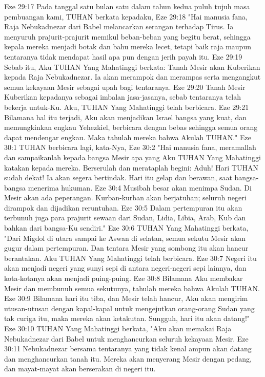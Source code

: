 Eze 29:17  Pada tanggal satu bulan satu dalam tahun kedua puluh tujuh masa pembuangan kami, TUHAN berkata kepadaku,
Eze 29:18  "Hai manusia fana, Raja Nebukadnezar dari Babel melancarkan serangan terhadap Tirus. Ia menyuruh prajurit-prajurit memikul beban-beban yang begitu berat, sehingga kepala mereka menjadi botak dan bahu mereka lecet, tetapi baik raja maupun tentaranya tidak mendapat hasil apa pun dengan jerih payah itu.
Eze 29:19  Sebab itu, Aku TUHAN Yang Mahatinggi berkata: Tanah Mesir akan Kuberikan kepada Raja Nebukadnezar. Ia akan merampok dan merampas serta mengangkut semua kekayaan Mesir sebagai upah bagi tentaranya.
Eze 29:20  Tanah Mesir Kuberikan kepadanya sebagai imbalan jasa-jasanya, sebab tentaranya telah bekerja untuk-Ku. Aku, TUHAN Yang Mahatinggi telah berbicara.
Eze 29:21  Bilamana hal itu terjadi, Aku akan menjadikan Israel bangsa yang kuat, dan memungkinkan engkau Yehezkiel, berbicara dengan bebas sehingga semua orang dapat mendengar engkau. Maka tahulah mereka bahwa Akulah TUHAN."
Eze 30:1  TUHAN berbicara lagi, kata-Nya,
Eze 30:2  "Hai manusia fana, meramallah dan sampaikanlah kepada bangsa Mesir apa yang Aku TUHAN Yang Mahatinggi katakan kepada mereka. Berserulah dan merataplah begini: Aduh! Hari TUHAN sudah dekat! Ia akan segera bertindak. Hari itu gelap dan berawan, saat bangsa-bangsa menerima hukuman.
Eze 30:4  Musibah besar akan menimpa Sudan. Di Mesir akan ada peperangan. Kurban-kurban akan berjatuhan; seluruh negeri dirampok dan dijadikan reruntuhan.
Eze 30:5  Dalam pertempuran itu akan terbunuh juga para prajurit sewaan dari Sudan, Lidia, Libia, Arab, Kub dan bahkan dari bangsa-Ku sendiri."
Eze 30:6  TUHAN Yang Mahatinggi berkata, "Dari Migdol di utara sampai ke Aswan di selatan, semua sekutu Mesir akan gugur dalam pertempuran. Dan tentara Mesir yang sombong itu akan hancur berantakan. Aku TUHAN Yang Mahatinggi telah berbicara.
Eze 30:7  Negeri itu akan menjadi negeri yang sunyi sepi di antara negeri-negeri sepi lainnya, dan kota-kotanya akan menjadi puing-puing.
Eze 30:8  Bilamana Aku membakar Mesir dan membunuh semua sekutunya, tahulah mereka bahwa Akulah TUHAN.
Eze 30:9  Bilamana hari itu tiba, dan Mesir telah hancur, Aku akan mengirim utusan-utusan dengan kapal-kapal untuk mengejutkan orang-orang Sudan yang tak curiga itu, maka mereka akan ketakutan. Sungguh, hari itu akan datang!"
Eze 30:10  TUHAN Yang Mahatinggi berkata, "Aku akan memakai Raja Nebukadnezar dari Babel untuk menghancurkan seluruh kekayaan Mesir.
Eze 30:11  Nebukadnezar bersama tentaranya yang tidak kenal ampun akan datang dan menghancurkan tanah itu. Mereka akan menyerang Mesir dengan pedang, dan mayat-mayat akan berserakan di negeri itu.
